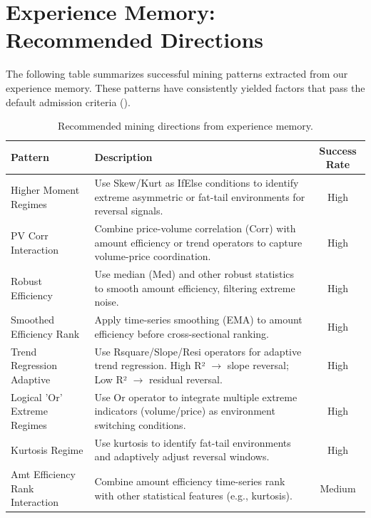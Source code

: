 \documentclass[sigconf]{acmart}
\begin{document}
\section{Experience Memory: Recommended Directions}
\label{app:recommended}

The following table summarizes successful mining patterns extracted from our experience memory.
These patterns have consistently yielded factors that pass the default admission criteria ().

\begin{table}[h]
  \caption{Recommended mining directions from experience memory.}
  \centering
  \begin{small}
  \begin{tabular}{p{3.5cm}p{8cm}c}
    \toprule
    Pattern & Description & Success Rate \\
    \midrule
    Higher Moment Regimes & Use Skew/Kurt as IfElse conditions to identify extreme asymmetric or fat-tail environments for reversal signals. & High \\
    PV Corr Interaction & Combine price-volume correlation (Corr) with amount efficiency or trend operators to capture volume-price coordination. & High \\
    Robust Efficiency & Use median (Med) and other robust statistics to smooth amount efficiency, filtering extreme noise. & High \\
    Smoothed Efficiency Rank & Apply time-series smoothing (EMA) to amount efficiency before cross-sectional ranking. & High \\
    Trend Regression Adaptive & Use Rsquare/Slope/Resi operators for adaptive trend regression. High R² $\rightarrow$ slope reversal; Low R² $\rightarrow$ residual reversal. & High \\
    Logical 'Or' Extreme Regimes & Use Or operator to integrate multiple extreme indicators (volume/price) as environment switching conditions. & High \\
    Kurtosis Regime & Use kurtosis to identify fat-tail environments and adaptively adjust reversal windows. & High \\
    Amt Efficiency Rank Interaction & Combine amount efficiency time-series rank with other statistical features (e.g., kurtosis). & Medium \\
    \bottomrule
  \end{tabular}
  \end{small}
\end{table}
\end{document}
